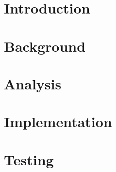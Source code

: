 




\thispagestyle{empty}
\newpage

\thispagestyle{plain}


\newpage

\setcounter{secnumdepth}{2} %
\setcounter{tocdepth}{2} %
\tableofcontents*


\chapter{Introduction}


\chapter{Background}
\label{bg}






% 
\newpage

\chapter{Analysis}
\label{an}


\newpage

\chapter{Implementation}
\label{im}







\newpage

\chapter{Testing}
\label{te}


